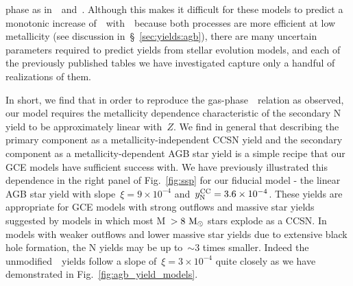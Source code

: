 \documentclass[ms.tex]{subfiles}
\begin{document}
phase as in~\karakasten~and~\karakas.
Although this makes it difficult for these models to predict a monotonic
increase of~\no~with~\oh~because both processes are more efficient at low
metallicity (see discussion in~\S~\ref{sec:yields:agb}), there are many
uncertain parameters required to predict yields from stellar evolution models,
and each of the previously published tables we have investigated capture only
a handful of realizations of them.
\par
In short, we find that in order to reproduce the gas-phase~\ohno~relation as
observed, our model requires the metallicity dependence characteristic of the
secondary N yield to be approximately linear with~$Z$.
We find in general that describing the primary component as a
metallicity-independent CCSN yield and the secondary component as a
metallicity-dependent AGB star yield is a simple recipe that our GCE models
have sufficient success with.
We have previously illustrated this dependence in the right panel of
Fig.~\ref{fig:ssp} for our fiducial model - the linear AGB star yield with
slope~$\xi = 9\times10^{-4}$ and~$y_\text{N}^\text{CC} = 3.6\times10^{-4}$.
These yields are appropriate for GCE models with strong outflows and massive
star yields suggested by models in which most M~$>8~\text{M}_\odot$ stars explode as a
CCSN.
In models with weaker outflows and lower massive star yields due to extensive
black hole formation, the N yields may be up to~$\sim$3 times smaller.
Indeed the unmodified~\cristallo~yields follow a slope of~$\xi = 3\times10^{-4}$
quite closely as we have demonstrated in Fig.~\ref{fig:agb_yield_models}.
\end{document}
